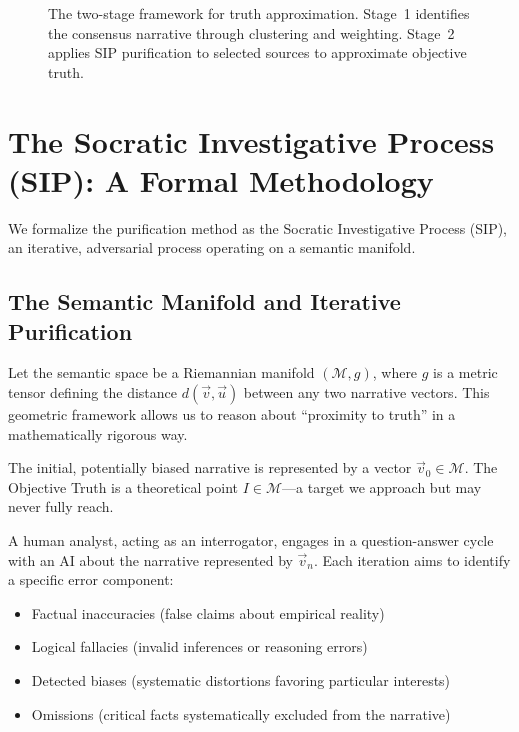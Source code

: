 \documentclass[11pt,a4paper]{article}
\begin{document}
\begin{small}
\begin{figure}[ht]
\caption{The two-stage framework for truth approximation. Stage~1 identifies the consensus narrative through clustering and weighting. Stage~2 applies SIP purification to selected sources to approximate objective truth.}
\label{fig:two_stage}
\end{figure}

\section{The Socratic Investigative Process (SIP): A Formal Methodology}

We formalize the purification method as the Socratic Investigative Process (SIP), an iterative, adversarial process operating on a semantic manifold.

\subsection{The Semantic Manifold and Iterative Purification}

Let the semantic space be a Riemannian manifold $(\mathcal{M}, g)$, where $g$ is a metric tensor defining the distance $d(\vec{v}, \vec{u})$ between any two narrative vectors. This geometric framework allows us to reason about ``proximity to truth'' in a mathematically rigorous way.

The initial, potentially biased narrative is represented by a vector $\vec{v}_0 \in \mathcal{M}$. The Objective Truth is a theoretical point $I \in \mathcal{M}$---a target we approach but may never fully reach.

A human analyst, acting as an interrogator, engages in a question-answer cycle with an AI about the narrative represented by $\vec{v}_n$. Each iteration aims to identify a specific error component:
\begin{itemize}[nosep]
    \item Factual inaccuracies (false claims about empirical reality)
    \item Logical fallacies (invalid inferences or reasoning errors)
    \item Detected biases (systematic distortions favoring particular interests)
    \item Omissions (critical facts systematically excluded from the narrative)
\end{itemize}


\end{small}
\end{document}
